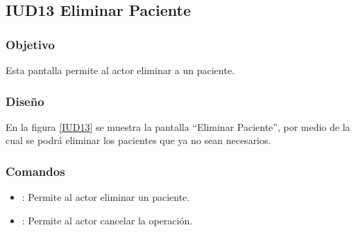 \subsection{IUD13 Eliminar Paciente}
 
\subsubsection{Objetivo}

    Esta pantalla permite al actor eliminar a un paciente.

\subsubsection{Diseño}

    En la figura \ref{IUD13} se muestra la pantalla ``Eliminar Paciente'', por medio de la cual se podrá eliminar los pacientes que ya no sean necesarios. \\


\subsubsection{Comandos}
\begin{itemize}
    \item {}: Permite al actor eliminar un paciente.
    \item {}: Permite al actor cancelar la operación.
    
\end{itemize}

%
